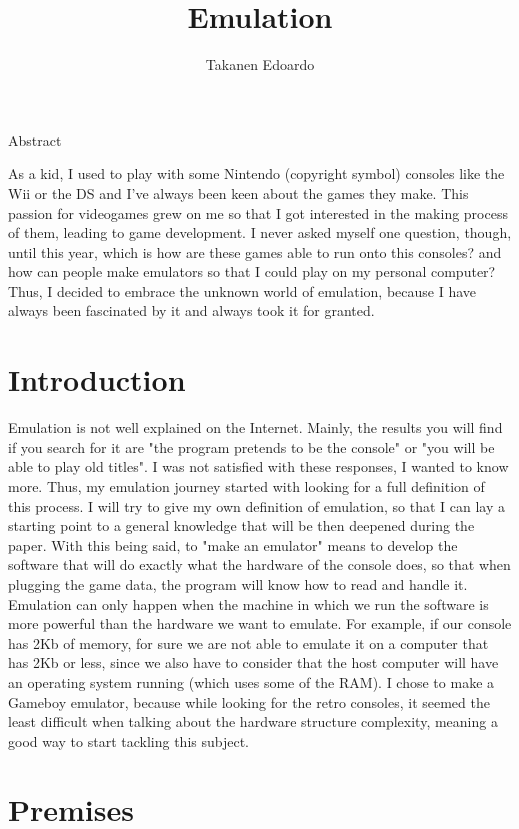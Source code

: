 \documentclass{article}
\title{Emulation}
\author{Takanen Edoardo}
\begin{document}
\maketitle
\begin{center}
\LARGE
Abstract \

\end{center}
As a kid, I used to play with some Nintendo (copyright symbol) consoles like the Wii or the DS and I've always been keen about the games they make. This passion for videogames grew on me so that I got interested in the making process of them, leading to game development. I never asked myself one question, though, until this year, which is how are these games able to run onto this consoles? and how can people make emulators so that I could play on my personal computer? Thus, I decided to embrace the unknown world of emulation, because I have always been fascinated by it and always took it for granted.
\newpage
\tableofcontents
\newpage
\section{Introduction}\label{sec:introduction}

Emulation is not well explained on the Internet. Mainly, the results you will find if you search for it are "the program pretends to be the console" or "you will be able to play old titles". I was not satisfied with these responses, I wanted to know more. Thus, my emulation journey started with looking for a full definition of this process. I will try to give my own definition of emulation, so that I can lay a starting point to a general knowledge that will be then deepened during the paper. With this being said, to "make an emulator" means to develop the software that will do exactly what the hardware of the console does, so that when plugging the game data, the program will know how to read and handle it. \\
Emulation can only happen when the machine in which we run the software is more powerful than the hardware we want to emulate. For example, if our console has 2Kb of memory, for sure we are not able to emulate it on a computer that has 2Kb or less, since we also have to consider that the host computer will have an operating system running (which uses some of the RAM). I chose to make a Gameboy emulator, because while looking for the retro consoles, it seemed the least difficult when talking about the hardware structure complexity, meaning a good way to start tackling this subject.
\newpage
\section{Premises}\label{sec:premises}
\end{document}
